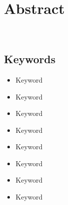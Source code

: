 \chapter*{Abstract}\label{ch:abstract-en}

\lipsum[1-3] \\

\section*{Keywords}\label{sec:keywords-en}
\begin{multicols}{2}
    \begin{itemize}
        \item Keyword
        \item Keyword
        \item Keyword
        \item Keyword
    \end{itemize}
    \columnbreak
    \begin{itemize}
        \item Keyword
        \item Keyword
        \item Keyword
        \item Keyword
    \end{itemize}
\end{multicols}